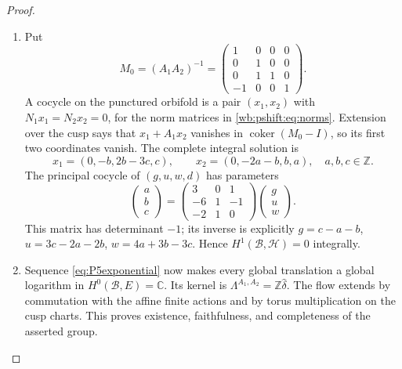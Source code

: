 \begin{proof}
\begin{enumerate}[label=\arabic*.,leftmargin=*]
\item   Put
\[
 M_0=(A_1A_2)^{-1}=\begin{pmatrix}1&0&0&0\\0&1&0&0\\0&1&1&0\\-1&0&0&1\end{pmatrix}.
\]
A cocycle on the punctured orbifold is a pair $(x_1,x_2)$ with
$N_1x_1=N_2x_2=0$, for the norm matrices in
\eqref{wb:pshift:eq:norms}.
Extension over the cusp says that $x_1+A_1x_2$ vanishes in
$\operatorname{coker}(M_0-I)$, so its first two coordinates vanish.
The complete integral solution is
\[
 x_1=(0,-b,2b-3c,c),\qquad x_2=(0,-2a-b,b,a),\quad a,b,c\in\mathbb Z.
\]
The principal cocycle of $(g,u,w,d)$ has parameters
\[
 \begin{pmatrix}a\\b\\c\end{pmatrix}
 =\begin{pmatrix}3&0&1\\-6&1&-1\\-2&1&0\end{pmatrix}
  \begin{pmatrix}g\\u\\w\end{pmatrix}.
\]
This matrix has determinant $-1$; its inverse is explicitly
$g=c-a-b$, $u=3c-2a-2b$, $w=4a+3b-3c$.  Hence
$H^1(\mathcal B,\mathcal H)=0$ integrally.

\item Sequence \eqref{eq:P5exponential} now makes every global translation a
global logarithm in $H^0(\mathcal B,E)=\mathbb C$.  Its kernel is
$\Lambda^{A_1,A_2}=\mathbb Z\widehat\delta$.  The flow extends by
commutation with the affine finite actions and by torus multiplication
on the cusp charts.  This proves existence, faithfulness, and
completeness of the asserted group.
\end{enumerate}
\end{proof}

